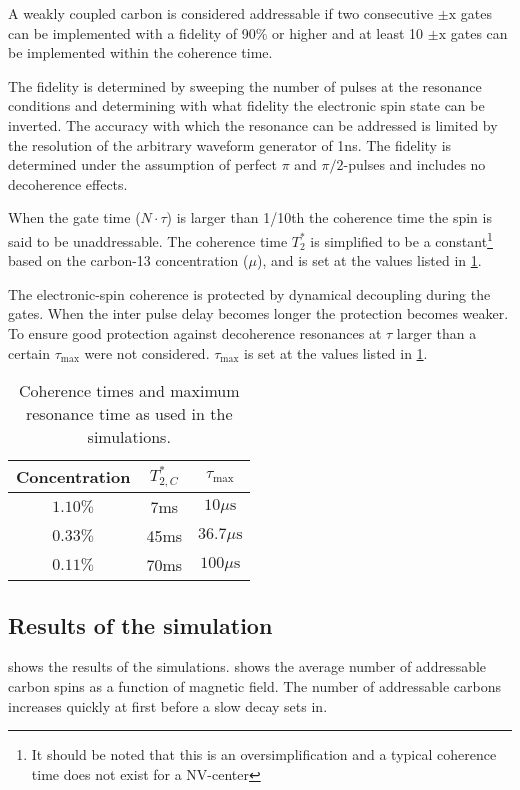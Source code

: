 A weakly coupled carbon is considered addressable if two consecutive $\pm \mathrm{x}$ gates can be implemented with a fidelity of 90\% or higher and at least 10 $\pm \mathrm{x}$ gates can be implemented within the coherence time.

The fidelity is determined by sweeping the number of pulses at the resonance conditions and determining with what fidelity the electronic spin state can be inverted.
The accuracy with which the resonance can be addressed is limited by the resolution of the arbitrary waveform generator of 1ns.
The fidelity is determined under the assumption of perfect $\pi$ and $\pi/2$-pulses and includes no decoherence effects.

When the gate time ($N\cdot\tau$) is larger than 1/10th the coherence time the spin is said to be unaddressable.
The coherence time $T_2^* $ is simplified to be a constant\footnote{It should be noted that this is an oversimplification and a typical coherence time does not exist for a NV-center\citep{Dobrovitski2008Decoherence}} based on the carbon-13 concentration ($\mu$), and is set at the values listed in \cref{tbl:concentration_Tmaxes}.

The electronic-spin coherence is protected by dynamical decoupling during the gates.
When the inter pulse delay becomes longer the protection becomes weaker.
To ensure good protection against decoherence resonances at $\tau$ larger than a certain $\tau_\mathrm{max}$ were not considered.
$\tau_{\mathrm{max}}$ is set at the values listed in \cref{tbl:concentration_Tmaxes}.
\begin{table}[htbp]
    \centering
    \caption{Coherence times and maximum resonance time as used in the simulations.}
    \begin{tabular}{ccc}
    Concentration &  $  T_{2,C}^* $ & $  \tau_{\mathrm{max} }$ \\ \hline
    $1.10\% $&  7ms & $10\mu\mathrm{s}$\\
    $0.33\% $&  45ms & $36.7\mu\mathrm{s}$\\
    $0.11\% $&  70ms & $100\mu\mathrm{s}$\\
    \end{tabular}
    \label{tbl:concentration_Tmaxes}
\end{table}

\subsection{Results of the simulation}
 shows the results of the simulations.
 shows the average number of addressable carbon spins as a function of magnetic field.
The number of addressable carbons increases quickly at first before a slow decay sets in.

